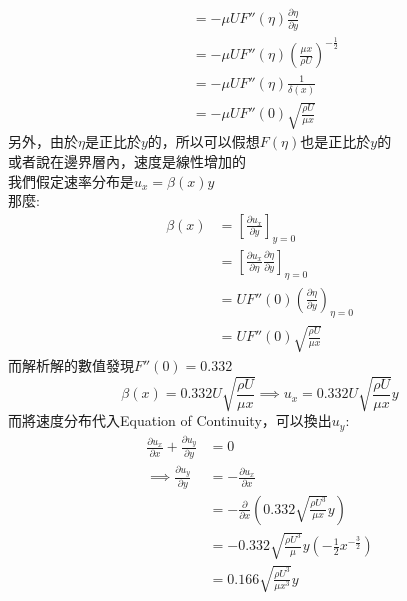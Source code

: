 \documentclass[../main.tex]{subfiles}
\begin{document}
\begin{itemize}
\begin{itemize}
\begin{enumerate}
\begin{itemize}
\begin{align}
        &= -\mu U F''(\eta) \frac{\partial \eta}{\partial y} \nonumber\\
        &= -\mu U F''(\eta) \left(
          \frac{\mu x}{\rho U}
        \right)^{-\frac{1}{2}} \nonumber\\
        &= -\mu U F''(\eta) \frac{1}{\delta(x)} \nonumber\\
        &= -\mu U F''(0) \sqrt{\frac{\rho U}{\mu x}} \label{eq:ch2_5_boundary_layer_dev_shear_stress}
      \end{align}
      另外，由於$\eta$是正比於$y$的，所以可以假想$F(\eta)$也是正比於$y$的\\
      或者說在邊界層內，速度是線性增加的\\
      我們假定速率分布是$u_x= \beta(x)y$\\
      那麼:
      \begin{align}
        \beta(x) &= \left[
          \frac{\partial u_x}{\partial y}
        \right]_{y=0} \nonumber\\
        & = \left[
          \frac{\partial u_x}{\partial \eta} \frac{\partial \eta}{\partial y}
        \right]_{\eta = 0} \nonumber\\
        &= U F''(0) \left(
          \frac{\partial \eta}{\partial y}
        \right)_{\eta=0} \nonumber\\
        &= U F''(0) \sqrt{\frac{\rho U}{\mu x}}
      \end{align}
      而解析解的數值發現$F''(0) = 0.332$
      \begin{equation}
        \beta(x) = 0.332 U \sqrt{\frac{\rho U}{\mu x}} \implies \boxed{u_x = 0.332 U \sqrt{\frac{\rho U}{\mu x}} y} \label{eq:ch2_5_boundary_layer_dev_velocity_profile}
      \end{equation}
      而將速度分布代入Equation of Continuity，可以換出$u_y$:
      \begin{align}
        \frac{\partial u_x}{\partial x} + \frac{\partial u_y}{\partial y} &= 0 \nonumber\\
        \implies \frac{\partial u_y}{\partial y} &= -\frac{\partial u_x}{\partial x} \nonumber\\
        &= -\frac{\partial}{\partial x} \left(
          0.332 \sqrt{\frac{\rho U^3}{\mu x}} y
        \right) \nonumber\\
       &= -0.332 \sqrt{\frac{\rho U^3}{\mu}} y \left(
        -\frac{1}{2} x^{-\frac{3}{2}}
        \right) \nonumber\\
       &= 0.166 \sqrt{\frac{\rho U^3}{\mu x^3}} y
      \end{align}

\end{itemize}
\end{enumerate}
\end{itemize}
\end{itemize}
\end{document}
